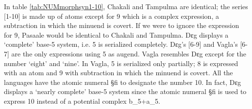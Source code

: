 \begin{table}[h]
{\begin{tabular}{p{0.4cm}l}
\end{tabular}
} 
\quad
{} 
\quad
{} 


\end{table}


  


In table \ref{tab:NUMmorphsyn1-10}, Chakali  and Tampulma   are identical; the
series [1-10] is made up of atoms except for 9 which is a complex expression, a
subtraction in which the minuend is covert. If we were to ignore the expression
for 9, Pasaale   would be identical to Chakali and Tampulma. Dɛg displays a
`complete' base-5 system, i.e. 5 is serialized completely. Dɛg's [6-9] and
Vagla's [6-7] are the only  expressions using 5 as augend. Vagla resembles Dɛg
except for the number `eight' and `nine'.  In Vagla, 5 is serialized only
partially; 8 is expressed with an atom and 9 with subtraction in which the
minuend is covert. All the languages have the atomic numeral {\S fi} to
designate the number 10.  In fact, Dɛg displays a `nearly complete' base-5
system since  the atomic numeral {\S fi} is used to express 10 instead of a
potential complex {\W b}_{5}+{\W a}_{5}.






